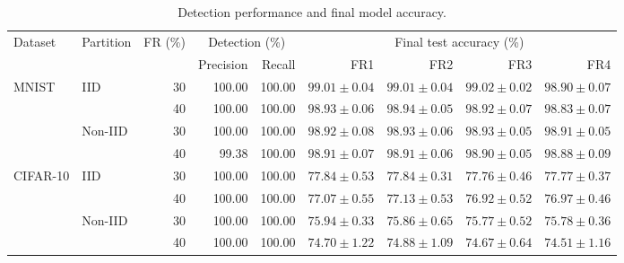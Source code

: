 \begin{table}[!tp]
\centering\footnotesize\setlength{\tabcolsep}{3.5pt}
\caption{Detection performance and final model accuracy.}\label{tab:performance}
\begin{tabular}{llrrrrrrr}
\toprule
\multirow{2}{*}{Dataset} & \multirow{2}{*}{Partition} & \multirow{2}{*}{FR (\%)} & \multicolumn{2}{c}{Detection (\%)} & \multicolumn{4}{c}{Final test accuracy (\%)} \\
\cmidrule(lr){4-5}\cmidrule(lr){6-9}
& & & Precision & Recall & FR1 & FR2 & FR3 & FR4 \\
\midrule
\multirow{4}{*}{MNIST} & \multirow{2}{*}{IID} & 30 & 100.00 & 100.00 & $99.01 \pm 0.04$ & $99.01 \pm 0.04$ & $99.02 \pm 0.02$ & $98.90 \pm 0.07$ \\
 &  & 40 & 100.00 & 100.00 & $98.93 \pm 0.06$ & $98.94 \pm 0.05$ & $98.92 \pm 0.07$ & $98.83 \pm 0.07$ \\
\cmidrule(lr){2-9}
 & \multirow{2}{*}{Non-IID} & 30 & 100.00 & 100.00 & $98.92 \pm 0.08$ & $98.93 \pm 0.06$ & $98.93 \pm 0.05$ & $98.91 \pm 0.05$ \\
 &  & 40 & 99.38 & 100.00 & $98.91 \pm 0.07$ & $98.91 \pm 0.06$ & $98.90 \pm 0.05$ & $98.88 \pm 0.09$ \\
\midrule
\multirow{4}{*}{CIFAR-10} & \multirow{2}{*}{IID} & 30 & 100.00 & 100.00 & $77.84 \pm 0.53$ & $77.84 \pm 0.31$ & $77.76 \pm 0.46$ & $77.77 \pm 0.37$ \\
 &  & 40 & 100.00 & 100.00 & $77.07 \pm 0.55$ & $77.13 \pm 0.53$ & $76.92 \pm 0.52$ & $76.97 \pm 0.46$ \\
\cmidrule(lr){2-9}
 & \multirow{2}{*}{Non-IID} & 30 & 100.00 & 100.00 & $75.94 \pm 0.33$ & $75.86 \pm 0.65$ & $75.77 \pm 0.52$ & $75.78 \pm 0.36$ \\
 &  & 40 & 100.00 & 100.00 & $74.70 \pm 1.22$ & $74.88 \pm 1.09$ & $74.67 \pm 0.64$ & $74.51 \pm 1.16$ \\
\bottomrule
\end{tabular}
\end{table}
